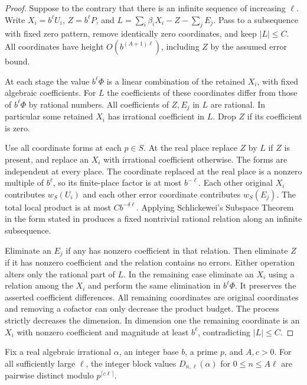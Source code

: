 \begin{proof}
Suppose to the contrary that there is an infinite sequence of increasing $\ell$. Write $X_i=b^\ell U_i$, $Z=b^\ell P$, and $L=\sum_i\beta_iX_i-Z-\sum_jE_j$. Pass to a subsequence with fixed zero pattern, remove identically zero coordinates, and keep $|L|\le C$. All coordinates have height $O(b^{(A+1)\ell})$, including $Z$ by the assumed error bound.

At each stage the value $b^\ell\Phi$ is a linear combination of the retained $X_i$, with fixed algebraic coefficients. For $L$ the coefficients of these coordinates differ from those of $b^\ell\Phi$ by rational numbers. All coefficients of $Z,E_j$ in $L$ are rational. In particular some retained $X_i$ has irrational coefficient in $L$. Drop $Z$ if its coefficient is zero.

Use all coordinate forms at each $p\in S$. At the real place replace $Z$ by $L$ if $Z$ is present, and replace an $X_i$ with irrational coefficient otherwise. The forms are independent at every place. The coordinate replaced at the real place is a nonzero multiple of $b^\ell$, so its finite-place factor is at most $b^{-\ell}$. Each other original $X_i$ contributes $w_S(U_i)$ and each other error coordinate contributes $w_S(E_j)$. The total local product is at most $Cb^{-\delta\ell}$. Applying Schlickewei's Subspace Theorem in the form stated in \cite[Theorem A]{ABind} produces a fixed nontrivial rational relation along an infinite subsequence.

Eliminate an $E_j$ if any has nonzero coefficient in that relation. Then eliminate $Z$ if it has nonzero coefficient and the relation contains no errors. Either operation alters only the rational part of $L$. In the remaining case eliminate an $X_i$ using a relation among the $X_i$ and perform the same elimination in $b^\ell\Phi$. It preserves the asserted coefficient differences. All remaining coordinates are original coordinates and removing a cofactor can only decrease the product budget. The process strictly decreases the dimension. In dimension one the remaining coordinate is an $X_i$ with nonzero coefficient and magnitude at least $b^\ell$, contradicting $|L|\le C$.
\end{proof}

\begin{corollary}\label{cor:modular}
Fix a real algebraic irrational $\alpha$, an integer base $b$, a prime $p$, and $A,c>0$. For all sufficiently large $\ell$, the integer block values $D_{n,\ell}(\alpha)$ for $0\le n\le A\ell$ are pairwise distinct modulo $p^{\lceil c\ell\rceil}$.
\end{corollary}

